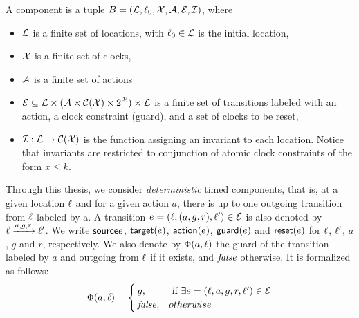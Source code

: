 \begin{definition}\label{def:tc}
  A component is a tuple $B=(\mathcal{L},\ell_0,\mathcal{X},\mathcal{A},\mathcal{E},\mathcal{I})$, where
  \begin{itemize}
    \item $\mathcal{L}$ is a finite set of locations, with $\ell_0\in\mathcal{L}$ is the 
      initial location,
    \item $\mathcal{X}$ is a finite set of clocks,
    \item $\mathcal{A}$ is a finite set of actions
    \item $\mathcal{E}\subseteq\mathcal{L}\times(\mathcal{A}\times\mathcal{C(X)}\times2^{\mathcal{X}})
      \times\mathcal{L}$ is a finite set of transitions labeled with an action, 
      a clock constraint (guard), and a set of clocks to be reset,
    \item $\mathcal{I}:\mathcal{L}\to\mathcal{C(X)}$ is the function assigning an invariant
      to each location. Notice that invariants are restricted to conjunction
      of atomic clock constraints of the form $x\le k$. 
  \end{itemize}
\end{definition}

Through this thesis, we consider 
\emph{deterministic} timed components, that is, at a given location
$\ell$ and for a given action $a$, there is up to one outgoing transition
from $\ell$ labeled by a. 
A transition $e=(\ell,(a,g,r),\ell')\in\mathcal{E}$ is also denoted by
$\ell\xrightarrow{a,g,r}\ell'$. We write $\textsf{source}{e}$, $\textsf{target}(e)$, $\textsf{action}(e)$, $\textsf{guard}(e)$
and $\textsf{reset}(e)$ for $\ell$, $\ell'$, $a$, $g$ and $r$, respectively.
We also denote by $\Phi(a,\ell)$ the guard 
of the transition labeled by $a$ and outgoing from $\ell$
if it exists, and $\textnormal{\textit{false}}$ otherwise. It is formalized as follows:
\[\Phi(a,\ell)=\begin{cases}
  g,& \text{ if } \exists e=(\ell,a,g,r,\ell')\in\mathcal{E}  \\
  \textnormal{\textit{false}},& otherwise
\end{cases}\]

